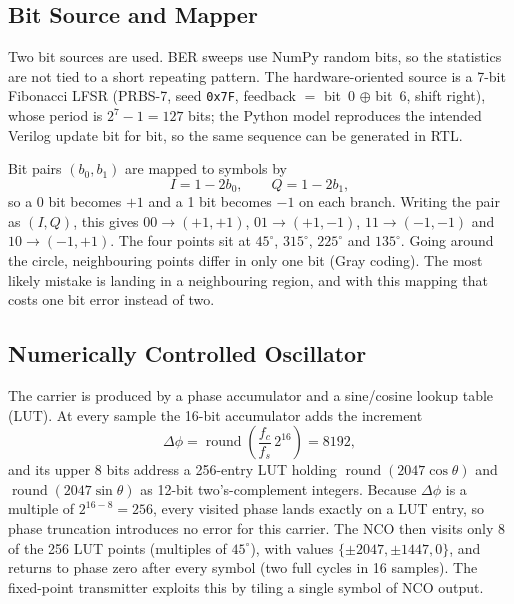 \documentclass[10pt,twocolumn,letterpaper]{article}
\begin{document}
\subsection{Bit Source and Mapper}

Two bit sources are used. BER sweeps use NumPy random bits, so the statistics
are not tied to a short repeating pattern. The hardware-oriented source is a
7-bit Fibonacci LFSR (PRBS-7, seed \texttt{0x7F}, feedback $=$ bit~0 $\oplus$
bit~6, shift right), whose period is $2^7-1=127$ bits; the Python model
reproduces the intended Verilog update bit for bit, so the same sequence can
be generated in RTL.

Bit pairs $(b_0,b_1)$ are mapped to symbols by
\begin{equation}
I = 1-2b_0, \qquad Q = 1-2b_1 ,
\end{equation}
so a 0 bit becomes $+1$ and a 1 bit becomes $-1$ on each branch. Writing the
pair as $(I,Q)$, this gives $00\!\to\!(+1,+1)$, $01\!\to\!(+1,-1)$,
$11\!\to\!(-1,-1)$ and $10\!\to\!(-1,+1)$. The four points sit at
$45^\circ$, $315^\circ$, $225^\circ$ and $135^\circ$. Going around the
circle, neighbouring points differ in only one bit (Gray coding). The most
likely mistake is landing in a neighbouring region, and with this mapping
that costs one bit error instead of two.

\subsection{Numerically Controlled Oscillator}

The carrier is produced by a phase accumulator and a sine/cosine lookup table
(LUT). At every sample the 16-bit accumulator adds the increment
\begin{equation}
\Delta\phi = \operatorname{round}\!\left(\frac{f_c}{f_s}\,2^{16}\right)=8192,
\end{equation}
and its upper 8 bits address a 256-entry LUT holding
$\operatorname{round}(2047\cos\theta)$ and $\operatorname{round}(2047\sin\theta)$
as 12-bit two's-complement integers. Because $\Delta\phi$ is a multiple of
$2^{16-8}=256$, every visited phase lands exactly on a LUT entry, so phase
truncation introduces no error for this carrier. The NCO then visits only 8 of
the 256 LUT points (multiples of $45^\circ$), with values
$\{\pm2047,\pm1447,0\}$, and returns to phase zero after every symbol
(two full cycles in 16 samples). The fixed-point transmitter exploits this by
tiling a single symbol of NCO output.
\end{document}
